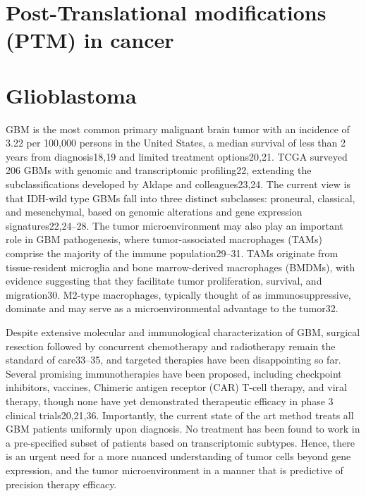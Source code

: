 \section{Post-Translational modifications (PTM) in cancer}




\section{Glioblastoma}
GBM is the most common primary malignant brain tumor with an incidence of 3.22 per 100,000 persons in the United States, a median survival of less than 2 years from diagnosis18,19 and limited treatment options20,21. TCGA surveyed 206 GBMs with genomic and transcriptomic profiling22, extending the subclassifications developed by Aldape and colleagues23,24. The current view is that IDH-wild type GBMs fall into three distinct subclasses: proneural, classical, and mesenchymal, based on genomic alterations and gene expression signatures22,24–28. The tumor microenvironment may also play an important role in GBM pathogenesis, where tumor-associated macrophages (TAMs) comprise the majority of the immune population29–31. TAMs originate from tissue-resident microglia and bone marrow-derived macrophages (BMDMs), with evidence suggesting that they facilitate tumor proliferation, survival, and migration30. M2-type macrophages, typically thought of as immunosuppressive, dominate and may serve as a microenvironmental advantage to the tumor32.

Despite extensive molecular and immunological characterization of GBM, surgical resection followed by concurrent chemotherapy and radiotherapy remain the standard of care33–35, and targeted therapies have been disappointing so far. Several promising immunotherapies have been proposed, including checkpoint inhibitors, vaccines, Chimeric antigen receptor (CAR) T-cell therapy, and viral therapy, though none have yet demonstrated therapeutic efficacy in phase 3 clinical trials20,21,36. Importantly, the current state of the art method treats all GBM patients uniformly upon diagnosis. No treatment has been found to work in a pre-specified subset of patients based on transcriptomic subtypes. Hence, there is an urgent need for a more nuanced understanding of tumor cells beyond gene expression, and the tumor microenvironment in a manner that is predictive of precision therapy efficacy.

